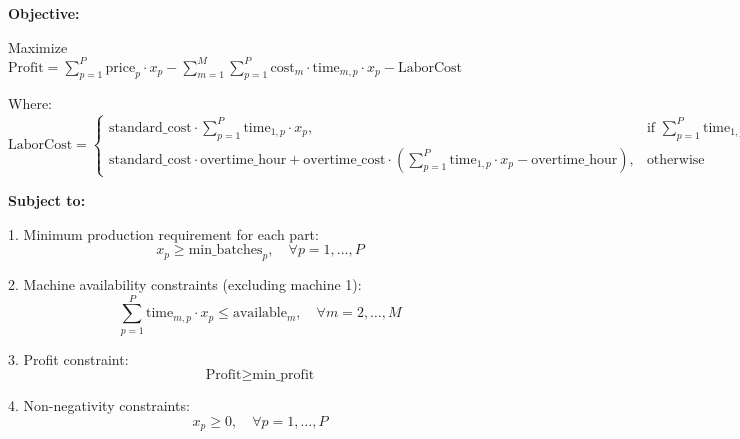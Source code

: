 \documentclass{article}
\begin{document}
\textbf{Objective:}

Maximize \( \text{Profit} = \sum_{p=1}^{P} \text{price}_p \cdot x_p - \sum_{m=1}^{M} \sum_{p=1}^{P} \text{cost}_m \cdot \text{time}_{m,p} \cdot x_p - \text{LaborCost} \)

Where:
\[
\text{LaborCost} = 
\begin{cases} 
\text{standard\_cost} \cdot \sum_{p=1}^{P} \text{time}_{1,p} \cdot x_p, & \text{if } \sum_{p=1}^{P} \text{time}_{1,p} \cdot x_p \leq \text{overtime\_hour}\\
\text{standard\_cost} \cdot \text{overtime\_hour} + \text{overtime\_cost} \cdot \left( \sum_{p=1}^{P} \text{time}_{1,p} \cdot x_p - \text{overtime\_hour} \right), & \text{otherwise}
\end{cases}
\]

\textbf{Subject to:}

1. Minimum production requirement for each part:
   \[
   x_p \geq \text{min\_batches}_p, \quad \forall p = 1, \ldots, P
   \]

2. Machine availability constraints (excluding machine 1):
   \[
   \sum_{p=1}^{P} \text{time}_{m,p} \cdot x_p \leq \text{available}_m, \quad \forall m = 2, \ldots, M
   \]

3. Profit constraint:
   \[
   \text{Profit} \geq \text{min\_profit}
   \]

4. Non-negativity constraints:
   \[
   x_p \geq 0, \quad \forall p = 1, \ldots, P
   \]
\end{document}
